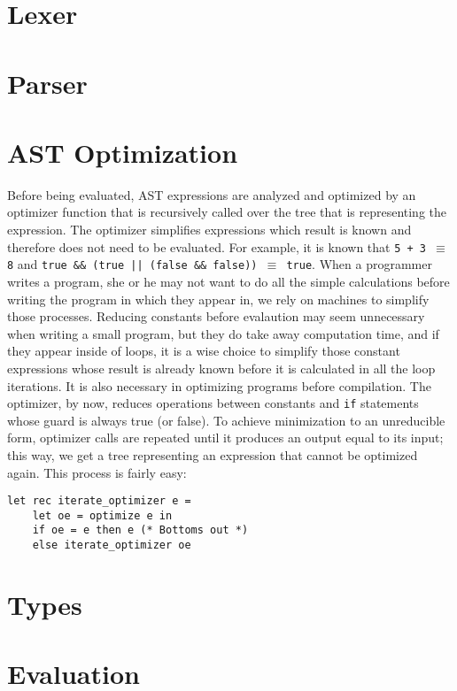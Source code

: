 \documentclass[a4paper, 11pt]{article}
\begin{document}
\begin{multicols}{2}
\section{Lexer}

\section{Parser}

\section{AST Optimization}
Before being evaluated, AST expressions are analyzed and optimized by an
optimizer function that is recursively called over the tree that is representing
the expression. The optimizer simplifies expressions which result is known and
therefore does not need to be evaluated. For example, it is known that \texttt{5
+ 3 $\equiv$ 8} and \texttt{true \&\& (true || (false \&\& false)) $\equiv$
true}. When a programmer writes a program, she or he may not want to do all the
simple calculations before writing the program in which they appear in, we rely
on machines to simplify those processes. Reducing constants before evalaution
may seem unnecessary when writing a small program, but they do take away
computation time, and if they appear inside of loops, it is a wise choice to
simplify those constant expressions whose result is already known before it is
calculated in all the loop iterations. It is also necessary in optimizing
programs before compilation. The optimizer, by now, reduces operations between
constants and \texttt{if} statements whose guard is always true (or false). To
achieve minimization to an unreducible form, optimizer calls are repeated until
it produces an output equal to its input; this way, we get a tree representing
an expression that cannot be optimized again. This process is fairly easy:

\begin{lstlisting}[style=caml]
let rec iterate_optimizer e =
	let oe = optimize e in
	if oe = e then e (* Bottoms out *)
	else iterate_optimizer oe
\end{lstlisting}

\section{Types}

\section{Evaluation}


\end{multicols}
\end{document}
